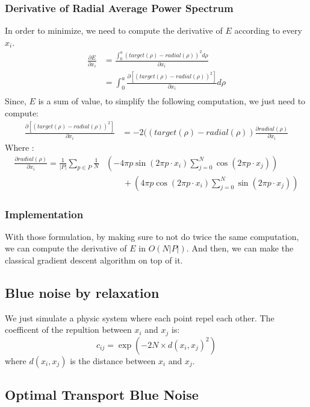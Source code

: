 \documentclass{classeENS}
\begin{document}
\subsubsection{Derivative of Radial Average Power Spectrum}
In order to minimize, we need to compute the derivative of $E$ according to every $x_i$. 
\begin{align*}
    \frac{\partial E}{\partial x_i} &= \frac{\int_0^a (target(\rho) - radial(\rho))^2 d\rho}{\partial x_i} \\
    &= \int_0^a \frac{\partial \left [(target(\rho) - radial(\rho))^2\right ]}{\partial x_i}d\rho \\
\end{align*}
Since, $E$ is a sum of value, to simplify the following computation, we just need to compute:
\begin{align*}
    \frac{\partial \left[ (target(\rho) - radial(\rho))^2\right ]}{\partial x_i} 
        &= -2((target(\rho) - radial(\rho))\frac{\partial radial(\rho)}{\partial x_i}
\end{align*}
Where :
\begin{align*}
    \frac{\partial radial(\rho)}{\partial x_i} = \frac{1}{|P|} \sum_{p\in P} \frac{1}{N} & \left ( -4\pi p \sin(2\pi p\cdot x_i) \sum_{j=0}^N \cos(2\pi p\cdot x_j) \right )\\
    &\qquad+ \left ( 4\pi p \cos(2\pi p\cdot x_i) \sum_{j=0}^N \sin(2\pi p\cdot x_j) \right)
\end{align*}

\subsubsection{Implementation}
With those formulation, by making sure to not do twice the same computation, we can
compute the derivative of $E$ in $O(N|P|)$. And then, we can make the classical gradient
descent algorithm on top of it.

\subsection{Blue noise by relaxation}

We just simulate a physic system where each point repel each other. The coefficent of the
repultion between $x_i$ and $x_j$ is:
\[c_{ij} = \exp(-2N\times d(x_i,x_j)^2) \]
where $d(x_i,x_j)$ is the distance between $x_i$ and $x_j$.

\subsection{Optimal Transport Blue Noise}
\end{document}
